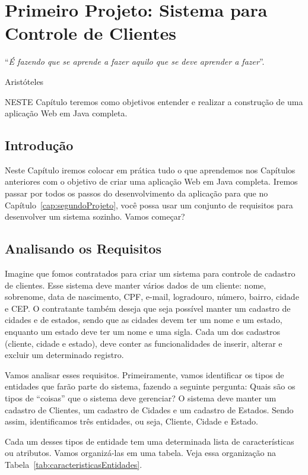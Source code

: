 \chapter{Primeiro Projeto: Sistema para Controle de Clientes}\label{cap:primeiroProjeto}
\epigraph{``\textit{É fazendo que se aprende a fazer aquilo que se deve aprender a fazer}''.}{Aristóteles}

\lettrine[lines=4, lhang=0.1, lraise=0, loversize=0.2, findent=0.1em]{\textcolor{corAzulTema}{N}}{ESTE} Capítulo teremos como objetivos entender e realizar a construção de uma aplicação Web em Java completa.


\section{Introdução}

Neste Capítulo iremos colocar em prática tudo o que aprendemos nos Capítulos anteriores com o objetivo de criar uma aplicação Web em Java completa. Iremos passar por todos os passos do desenvolvimento da aplicação para que no Capítulo~\ref{cap:segundoProjeto}, você possa usar um conjunto de requisitos para desenvolver um sistema sozinho. Vamos começar?


\section{Analisando os Requisitos}

Imagine que fomos contratados para criar um sistema para controle de cadastro de clientes. Esse sistema deve manter vários dados de um cliente: nome, sobrenome, data de nascimento, CPF, e-mail, logradouro, número, bairro, cidade e CEP. O contratante também deseja que seja possível manter um cadastro de cidades e de estados, sendo que as cidades devem ter um nome e um estado, enquanto um estado deve ter um nome e uma sigla. Cada um dos cadastros (cliente, cidade e estado), deve conter as funcionalidades de inserir, alterar e excluir um determinado registro.

Vamos analisar esses requisitos. Primeiramente, vamos identificar os tipos de entidades que farão parte do sistema, fazendo a seguinte pergunta: Quais são os tipos de ``coisas'' que o sistema deve gerenciar? O sistema deve manter um cadastro de Clientes, um cadastro de Cidades e um cadastro de Estados. Sendo assim, identificamos três entidades, ou seja, Cliente, Cidade e Estado.

Cada um desses tipos de entidade tem uma determinada lista de características ou atributos. Vamos organizá-las em uma tabela. Veja essa organização na Tabela~\ref{tab:caracteristicasEntidades}.

